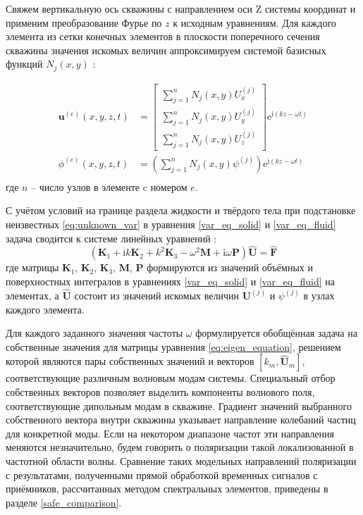 \documentclass[a4paper,11pt]{article}
\newcommand{\ii}{\mathrm{i}}
\begin{document}
Свяжем вертикальную ось скважины с направлением оси Z системы координат и применим преобразование Фурье по $z$ к исходным уравнениям. Для каждого элемента из сетки конечных элементов в плоскости поперечного сечения скважины значения искомых величин аппроксимируем системой базисных функций $N_j(x,y)$ \cite{Zienkiewicz2000}:

\begin{equation}
\begin{split}
\mathbf{u}^{(e)}(x,y,z,t) &= \left[
\begin{array}{c}
\sum_{j=1}^{n}N_j(x,y)U_{x}^{(j)} \\
\sum_{j=1}^{n}N_j(x,y)U_{y}^{(j)} \\
\sum_{j=1}^{n}N_j(x,y)U_{z}^{(j)} 
\end{array}
\right] \mathrm{e}^{\ii (kz-\omega t)} %
\\
\phi^{(e)}(x,y,z,t) &= \left(\sum_{j=1}^{n}N_j(x,y)\psi^{(j)} \right) \mathrm{e}^{\ii (kz-\omega t)} %
\\
\end{split} \label{eq:unknown_var}
\end{equation}
где $n$ -- число узлов в элементе c номером $e$.  

С учётом условий на границе раздела жидкости и твёрдого тела при подстановке неизвестных \eqref{eq:unknown_var} в уравнения \eqref{var_eq_solid} и \eqref{var_eq_fluid} задача сводится к системе линейных уравнений \cite{Bartoli2006,Treyssede2013}:
\begin{equation}
(\mathbf{K}_1 + \ii k \mathbf{K}_2 + k^2 \mathbf{K}_3 - \omega^2 \mathbf{M} + \ii \omega \mathbf{P}) \hat{\mathbf{U}} = \hat{\mathbf{F}} \label{eq:eigen_equation}
\end{equation}
где матрицы $\mathbf{K}_1$, $\mathbf{K}_2$, $\mathbf{K}_3$, $\mathbf{M}$, $\mathbf{P}$ формируются из значений объёмных и поверхностных интегралов в уравнениях \eqref{var_eq_solid} и \eqref{var_eq_fluid} на элементах, а $ \hat{\mathbf{U}}$ состоит из значений искомых величин $\mathbf{U}^{(j)}$ и $\psi^{(j)}$ в узлах каждого элемента. 

Для каждого заданного значения частоты $\omega$ формулируется обобщённая задача на собственные значения для матрицы уравнения \eqref{eq:eigen_equation}, решением которой являются пары собственных значений и векторов $[k_m, \hat{\mathbf{U}}_m]$, соответствующие различным волновым модам системы. Специальный отбор собственных векторов позволяет выделить компоненты волнового поля, соответствующие дипольным модам в скважине. Градиент значений выбранного собственного вектора внутри скважины указывает направление колебаний частиц для конкретной моды. Если на некотором диапазоне частот эти направления меняются незначительно, будем говорить о поляризации такой локализованной в частотной области волны. Сравнение таких модельных направлений поляризации с результатами, полученными прямой обработкой временных сигналов с приёмников, рассчитанных методом спектральных элементов, приведены в разделе \ref{safe_comparison}.
\end{document}
